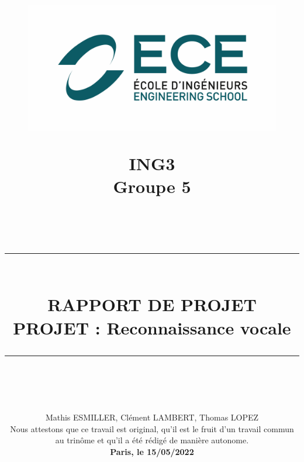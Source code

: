 \documentclass[a4paper,11pt]{book}
\newcommand{\HRule}[1]{\rule{\linewidth}{#1}}
\begin{document}
	
	\begin{titlepage}
	\title{\vspace{-5em}
		\begin{figure}[htb]
			\begin{minipage}[t]{.45\textwidth}
				\centering
				\includegraphics[width=\textwidth]{ece.png}
			\end{minipage}
			\hfill
			\begin{minipage}[t]{.45\textwidth}
				\centering
				\flushright\vspace{-12mm}\Large{\textbf{ING{3}}\\ Groupe {5}}
			\end{minipage}  
		\end{figure}
		\normalsize \textsc{} \\ [1.2cm]
		\HRule{1.5pt} \\ [0.5cm]
		\LARGE \textbf{\Large{RAPPORT DE PROJET}\\ \vspace{5mm}
			\Huge{\textcolor{ece}{PROJET : {Reconnaissance vocale}}}}
		\HRule{1.5pt} \\ 
		\normalsize  \vspace{1cm}
		}
	\date{Mathis ESMILLER, Clément LAMBERT, Thomas LOPEZ\\ Nous attestons que ce travail est original, qu’il est le fruit d’un travail commun au trinôme et qu’il a été rédigé de manière autonome. \\ \textbf{{Paris, le 15/05/2022}}}
	
	\author{}
\end{titlepage}
	
\end{document}

